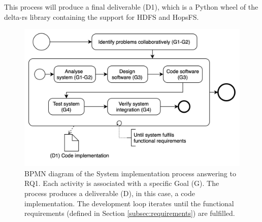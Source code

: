 This process will produce a final deliverable (D1), which is a Python wheel of the delta-rs library containing the support for \gls{HDFS} and \gls{HopsFS}.

\begin{figure}[!ht]
    \begin{center}
      \includegraphics[width=\textwidth]{figures/3-method/research_process_rq1.png}
    \caption{\gls{BPMN} diagram of the System implementation process answering to RQ1. Each activity is associated with a specific Goal (\gls{G}). The process produces a deliverable (\gls{D}), in this case, a code implementation. The development loop iterates until the functional requirements (defined in Section \ref{subsec:requirements}) are fulfilled.}
    \label{fig:DevProcessRQ1}
    \end{center}
\end{figure}

